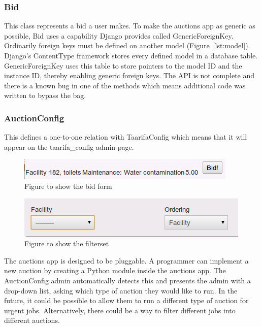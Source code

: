 \subsubsection{Bid}
This class represents a bid a user makes. To make the auctions app as generic as possible, Bid uses a capability Django provides called GenericForeignKey. Ordinarily foreign keys must be defined on another model (Figure~\ref{lst:model}). Django's ContentType framework stores every defined model in a database table. GenericForeignKey uses this table to store pointers to the model ID and the instance ID, thereby enabling generic foreign keys. The API is not complete and there is a known bug in one of the methods which means additional code was written to bypass the bag. \\

\subsubsection{AuctionConfig}
This defines a one-to-one relation with TaarifaConfig which means that it will appear on the taarifa\_config admin page. \\

\begin{figure}
\centering
\includegraphics[scale=0.45]{img/bidform.png}
\caption{Figure to show the bid form}
\label{fig:bidform}
\end{figure}

\begin{figure}
\centering
\includegraphics[scale=0.45]{img/filterset.png}
\caption{Figure to show the filterset}
\label{fig:filter}
\end{figure}

The auctions app is designed to be pluggable. A programmer can implement a new auction by creating a Python module inside the auctions app. The AuctionConfig admin automatically detects this and presents the admin with a drop-down list, asking which type of auction they would like to run. In the future, it could be possible to allow them to run a different type of auction for urgent jobs. Alternatively, there could be a way to filter different jobs into different auctions. \\


